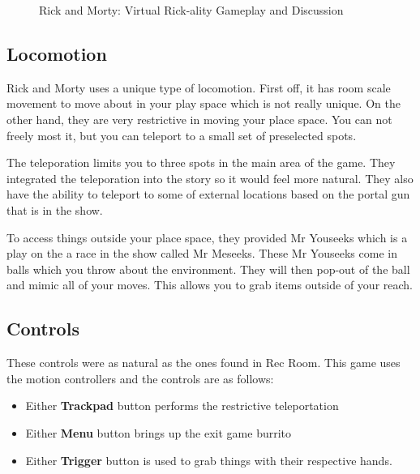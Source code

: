 \documentclass[journal]{IEEEtran}
\begin{document}
\begin{figure}[h]
	\centering
	\caption{Rick and Morty: Virtual Rick-ality Gameplay and Discussion}
	\label{Rick_and_Morty}
\end{figure}

\subsection{Locomotion}
Rick and Morty uses a unique type of locomotion. First off, it has room scale movement to move about in your play space which is not really unique. On the other hand, they are very restrictive in moving your place space. You can not freely most it, but you can teleport to a small set of preselected spots. 

The teleporation limits you to three spots in the main area of the game. They integrated the teleporation into the story so it would feel more natural. They also have the ability to teleport to some of external locations based on the portal gun that is in the show. 

To access things outside your place space, they provided Mr Youseeks which is a play on the a race in the show called Mr Meseeks. These Mr Youseeks come in balls which you throw about the environment. They will then pop-out of the ball and mimic all of your moves. This allows you to grab items outside of your reach. 


\subsection{Controls}
These controls were as natural as the ones found in Rec Room. This game uses the motion controllers and the controls are as follows: 
\begin{itemize}
	\item Either \textbf{Trackpad} button performs the restrictive teleportation
	\item Either \textbf{Menu} button brings up the exit game burrito
	\item Either \textbf{Trigger} button is used to grab things with their respective hands.
\end{itemize}
\end{document}
